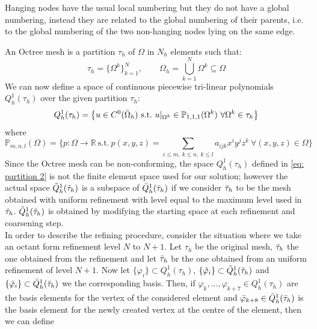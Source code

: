 \documentclass{Configuration_Files/PoliMi3i_thesis}
\let\phi\varphi
\begin{document}
Hanging nodes have the usual local numbering but they do not have a global numbering, instead they are related to the global numbering of their parents, i.e. to the global numbering of the two non-hanging nodes lying on the same edge.

An Octree mesh is a partition $\tau_h$ of $\Omega$ in $N_h$ elements such that:
\begin{equation}
    \tau_h=\{\Omega^k\}_{k=1}^N,\qquad \Omega_h=\bigcup_{k=1}^N\Omega^k\subseteq \Omega
    \label{eq: partition 1}
\end{equation}
We can now define a space of continuous piecewise tri-linear polynomials $Q^1_h(\tau_h)$ over the given partition $\tau_h$:
\begin{equation}
    Q^1_h(\tau_h)=\left\{u\in C^0(\Bar{\Omega}_h)\ \text{s.t.}\ u|_{\Omega^k}\in\mathbb{P}_{1,1,1}(\Omega^k)\ \forall \Omega^k\in\tau_h\right\}
    \label{eq: partition 2}
\end{equation}
where
\begin{equation}
    \mathbb{P}_{m,n,l}(\Omega)=\{p:\Omega\rightarrow\mathbb{R}\ \text{s.t.}\ p(x,y,z)=\sum_{i\le m,\ k\le n,\ k\le l}a_{ijk}x^iy^jz^k\ \forall (x,y,z)\in\Omega\}
    \label{eq: partition 3}
\end{equation}
Since the Octree mesh can be non-conforming, the space $Q^1_h(\tau_h)$ defined in \ref{eq: partition 2} is not the finite element space used for our solution; however the actual space $\Tilde{Q}^1_h(\Tilde{\tau}_h)$ is a subspace of $\Bar{Q}^1_h(\Bar{\tau}_h)$ if we consider $\Bar{\tau}_h$ to be the mesh obtained with uniform refinement with level equal to the maximum level used in $\Tilde{\tau}_h$. $\Tilde{Q}^1_h(\Tilde{\tau}_h)$ is obtained by modifying the starting space at each refinement and coarsening step.
\\In order to describe the refining procedure, consider the situation where we take an octant form refinement level $N$ to $N+1$. Let $\tau_h$ be the original mesh, $\Tilde{\tau}_h$ the one obtained from the refinement and let $\Bar{\tau}_h$ br the one obtained from an uniform refinement of level $N+1$. Now let $\{\phi_i\}\subset Q^1_h(\tau_h)$, $\{\Tilde{\phi}_i\}\subset \Tilde{Q}^1_h(\Tilde{\tau}_h)$ and $\{\Bar{\phi}_i\}\subset \Bar{Q}^1_h(\Bar{\tau}_h)$ we the corresponding basis. Then, if $\phi_k,\dots,\phi_{k+7}\in Q^1_h(\tau_h)$ are the basis elements for the vertex of the considered element and $\Bar{\phi}_{k+8}\in\Bar{Q}^1_h(\Bar{\tau}_h)$ is the basis element for the newly created vertex at the centre of the element, then we can define
\end{document}

